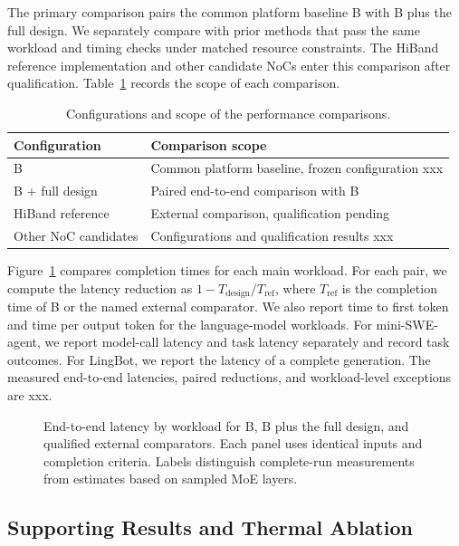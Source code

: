 \documentclass[conference,10pt]{IEEEtran}
\newcommand{\Description}[1]{}
\begin{document}
The primary comparison pairs the common platform baseline B with B plus the full design. We separately compare with prior methods that pass the same workload and timing checks under matched resource constraints. The HiBand reference implementation and other candidate NoCs enter this comparison after qualification. Table~\ref{tab:eval-comparisons} records the scope of each comparison.

\begin{table}[t]
\caption{Configurations and scope of the performance comparisons.}
\label{tab:eval-comparisons}
\centering\small
\begin{tabular}{@{}lp{}@{}}
\hline
Configuration & Comparison scope \\
\hline
B & Common platform baseline, frozen configuration xxx \\
B + full design & Paired end-to-end comparison with B \\
HiBand reference & External comparison, qualification pending \\
Other NoC candidates & Configurations and qualification results xxx \\
\hline
\end{tabular}
\end{table}

Figure~\ref{fig:eval-overall} compares completion times for each main workload. For each pair, we compute the latency reduction as $1-T_{\mathrm{design}}/T_{\mathrm{ref}}$, where $T_{\mathrm{ref}}$ is the completion time of B or the named external comparator. We also report time to first token and time per output token for the language-model workloads. For mini-SWE-agent, we report model-call latency and task latency separately and record task outcomes. For LingBot, we report the latency of a complete generation. The measured end-to-end latencies, paired reductions, and workload-level exceptions are xxx.

\begin{figure}[t]
\centering
\fbox{\rule{0pt}{18mm}\rule{0.92\textwidth}{0pt}}
\caption{End-to-end latency by workload for B, B plus the full design, and qualified external comparators. Each panel uses identical inputs and completion criteria. Labels distinguish complete-run measurements from estimates based on sampled MoE layers.}
\Description{Reserved space for the end-to-end latency comparison.}
\label{fig:eval-overall}
\end{figure}

\subsection{Supporting Results and Thermal Ablation}
\end{document}
